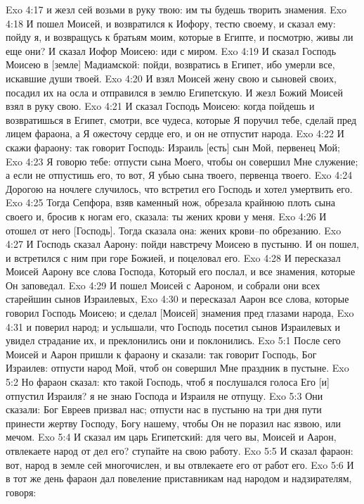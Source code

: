Exo 4:17  и жезл сей возьми в руку твою: им ты будешь творить знамения.
Exo 4:18  И пошел Моисей, и возвратился к Иофору, тестю своему, и сказал ему: пойду я, и возвращусь к братьям моим, которые в Египте, и посмотрю, живы ли еще они? И сказал Иофор Моисею: иди с миром.
Exo 4:19  И сказал Господь Моисею в [земле] Мадиамской: пойди, возвратись в Египет, ибо умерли все, искавшие души твоей.
Exo 4:20  И взял Моисей жену свою и сыновей своих, посадил их на осла и отправился в землю Египетскую. И жезл Божий Моисей взял в руку свою.
Exo 4:21  И сказал Господь Моисею: когда пойдешь и возвратишься в Египет, смотри, все чудеса, которые Я поручил тебе, сделай пред лицем фараона, а Я ожесточу сердце его, и он не отпустит народа.
Exo 4:22  И скажи фараону: так говорит Господь: Израиль [есть] сын Мой, первенец Мой;
Exo 4:23  Я говорю тебе: отпусти сына Моего, чтобы он совершил Мне служение; а если не отпустишь его, то вот, Я убью сына твоего, первенца твоего.
Exo 4:24  Дорогою на ночлеге случилось, что встретил его Господь и хотел умертвить его.
Exo 4:25  Тогда Сепфора, взяв каменный нож, обрезала крайнюю плоть сына своего и, бросив к ногам его, сказала: ты жених крови у меня.
Exo 4:26  И отошел от него [Господь]. Тогда сказала она: жених крови--по обрезанию.
Exo 4:27  И Господь сказал Аарону: пойди навстречу Моисею в пустыню. И он пошел, и встретился с ним при горе Божией, и поцеловал его.
Exo 4:28  И пересказал Моисей Аарону все слова Господа, Который его послал, и все знамения, которые Он заповедал.
Exo 4:29  И пошел Моисей с Аароном, и собрали они всех старейшин сынов Израилевых,
Exo 4:30  и пересказал Аарон все слова, которые говорил Господь Моисею; и сделал [Моисей] знамения пред глазами народа,
Exo 4:31  и поверил народ; и услышали, что Господь посетил сынов Израилевых и увидел страдание их, и преклонились они и поклонились.
Exo 5:1  После сего Моисей и Аарон пришли к фараону и сказали: так говорит Господь, Бог Израилев: отпусти народ Мой, чтоб он совершил Мне праздник в пустыне.
Exo 5:2  Но фараон сказал: кто такой Господь, чтоб я послушался голоса Его [и] отпустил Израиля? я не знаю Господа и Израиля не отпущу.
Exo 5:3  Они сказали: Бог Евреев призвал нас; отпусти нас в пустыню на три дня пути принести жертву Господу, Богу нашему, чтобы Он не поразил нас язвою, или мечом.
Exo 5:4  И сказал им царь Египетский: для чего вы, Моисей и Аарон, отвлекаете народ от дел его? ступайте на свою работу.
Exo 5:5  И сказал фараон: вот, народ в земле сей многочислен, и вы отвлекаете его от работ его.
Exo 5:6  И в тот же день фараон дал повеление приставникам над народом и надзирателям, говоря:

